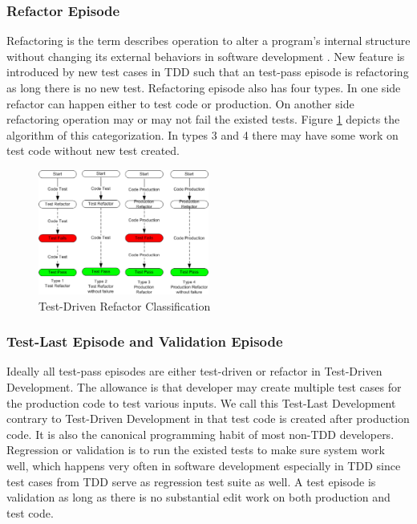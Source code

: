 \documentclass[11pt,twocolumn]{article}
\begin{document}
\subsubsection{Refactor Episode}
Refactoring is the term describes operation to alter a program's internal
structure without changing its external behaviors in software development
\cite{Refactoring}. New feature is introduced by new test cases in TDD such
that an test-pass episode is refactoring as long there is no new test.
Refactoring episode also has four types. In one side refactor can happen
either to test code or production. On another side refactoring operation
may or may not fail the existed tests. Figure \ref{fig:Refactor} depicts
the algorithm of this categorization. In types 3 and 4 there may have some
work on test code without new test created.

\begin{figure}[ht] 
  \centering
  \includegraphics[width=0.5\textwidth]{picture/Refactoring.eps}
  \caption{Test-Driven Refactor Classification}\label{fig:Refactor}
\end{figure} 

\subsubsection{Test-Last Episode and Validation Episode}
Ideally all test-pass episodes are either test-driven or refactor in
Test-Driven Development. The allowance is that developer may create
multiple test cases for the production code to test various inputs. We call
this Test-Last Development contrary to Test-Driven Development in that test
code is created after production code. It is also the canonical programming
habit of most non-TDD developers. Regression or validation is to run the
existed tests to make sure system work well, which happens very often in
software development especially in TDD since test cases from TDD serve as
regression test suite as well. A test episode is validation as long as
there is no substantial edit work on both production and test code.
\end{document}
